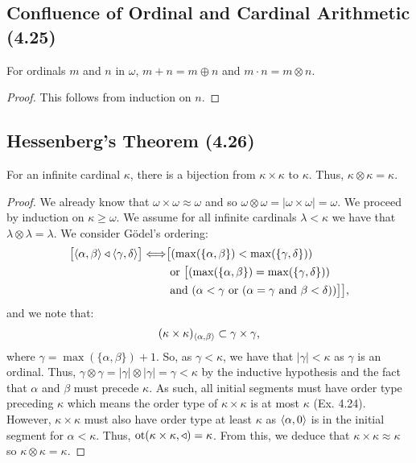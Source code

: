 \subsection{Confluence of Ordinal and Cardinal Arithmetic (4.25)} \label{4.25}

For ordinals $m$ and $n$ in $\omega$, $m + n = m \oplus n$ and $m \cdot n = m \otimes n$.

\begin{proof}
    This follows from induction on $n$.
\end{proof}

\subsection{Hessenberg's Theorem (4.26)} \label{4.26}

For an infinite cardinal $\kappa$, there is a bijection from $\kappa \times \kappa$
to $\kappa$. Thus, $\kappa \otimes \kappa = \kappa$.

\begin{proof}
    We already know that $\omega \times \omega \approx \omega$ and so 
    $\omega \otimes \omega = |\omega \times \omega| = \omega$. We proceed by
    induction on $\kappa \geq \omega$. We assume for all infinite cardinals 
    $\lambda < \kappa$ we have that $\lambda \otimes \lambda = \lambda$. 
    We consider Gödel's ordering: \begin{align*}
        \bigl[
            {\langle \alpha, \beta \rangle} \triangleleft {\langle \gamma, \delta \rangle}
        \bigr]
        \Longleftrightarrow&
        \bigl[
            (\max(\{\alpha, \beta\}) < \max(\{\gamma, \delta\})) \\
            & \text{ or } \bigl[
            (\max(\{\alpha, \beta\}) = \max(\{\gamma, \delta\})) \\
            & \text{ and }
            (\alpha < \gamma \text{ or } (\alpha = \gamma \text{ and } \beta < \delta))
        \bigr]\bigr],
    \end{align*} and we note that: \begin{align*}
        (\kappa \times \kappa)_{{\langle \alpha, \beta \rangle}} \subset \gamma \times \gamma,
    \end{align*} where $\gamma = \max(\{\alpha, \beta\}) + 1$. So, as $\gamma < \kappa$,
    we have that $|\gamma| < \kappa$ as $\gamma$ is an ordinal. Thus, 
    $\gamma \otimes \gamma = |\gamma| \otimes |\gamma| = \gamma < \kappa$ by the 
    inductive hypothesis and the fact that $\alpha$ and $\beta$ must precede $\kappa$. 
    As such, all initial segments must have order type preceding $\kappa$ which
    means the order type of $\kappa \times \kappa$ is at most $\kappa$ (Ex. 4.24).
    However, $\kappa \times \kappa$ must also have order type at least 
    $\kappa$ as ${\langle \alpha, 0 \rangle}$ is in the initial segment for $\alpha < \kappa$. Thus, 
    $\operatorname{ot}(\kappa \times \kappa, \triangleleft) = \kappa$. From this, we deduce that
    $\kappa \times \kappa \approx \kappa$ so $\kappa \otimes \kappa = \kappa$.
\end{proof}

